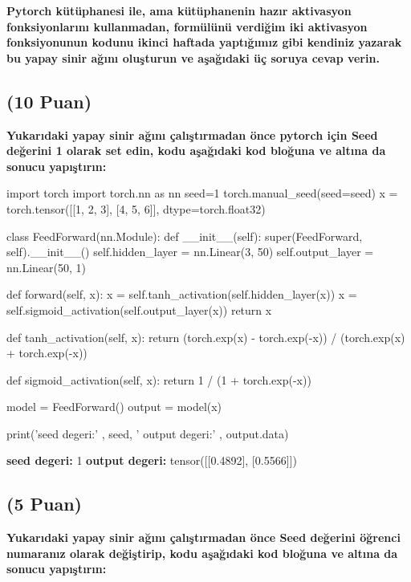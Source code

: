 \documentclass[11pt]{article}
\begin{document}
 \textbf{Pytorch kütüphanesi ile, ama kütüphanenin hazır aktivasyon fonksiyonlarını kullanmadan, formülünü verdiğim iki aktivasyon fonksiyonunun kodunu ikinci haftada yaptığımız gibi kendiniz yazarak bu yapay sinir ağını oluşturun ve aşağıdaki üç soruya cevap verin.}
 
\subsection{(10 Puan)} \textbf{Yukarıdaki yapay sinir ağını çalıştırmadan önce pytorch için Seed değerini 1 olarak set edin, kodu aşağıdaki kod bloğuna ve altına da sonucu yapıştırın:}

\begin{python}
import torch
import torch.nn as nn
seed=1
torch.manual_seed(seed=seed)
x = torch.tensor([[1, 2, 3], [4, 5, 6]], dtype=torch.float32)

class FeedForward(nn.Module):
    def __init__(self):
        super(FeedForward, self).__init__()
        self.hidden_layer = nn.Linear(3, 50)
        self.output_layer = nn.Linear(50, 1)

    def forward(self, x):
        x = self.tanh_activation(self.hidden_layer(x))
        x = self.sigmoid_activation(self.output_layer(x))
        return x
    
    def tanh_activation(self, x):
        return (torch.exp(x) - torch.exp(-x)) / (torch.exp(x) + torch.exp(-x))
    
    def sigmoid_activation(self, x):
        return 1 / (1 + torch.exp(-x))

model = FeedForward()
output = model(x)

print('seed degeri:' , seed, ' output degeri:' ,  output.data)
\end{python}

 \textbf{seed degeri:} 1   \textbf{output degeri:}  tensor([[0.4892], [0.5566]])

\subsection{(5 Puan)} \textbf{Yukarıdaki yapay sinir ağını çalıştırmadan önce Seed değerini öğrenci numaranız olarak değiştirip, kodu aşağıdaki kod bloğuna ve altına da sonucu yapıştırın:}
\vspace{.6in}
\end{document}
